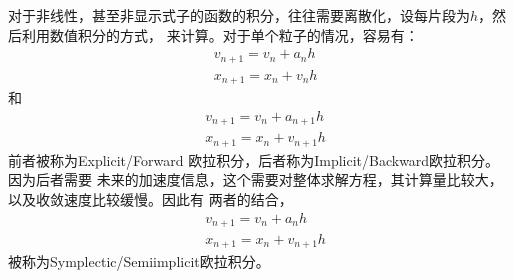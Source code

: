 \documentclass[lang=cn,newtx,10pt,scheme=chinese]{elegantbook}
\begin{document}
对于非线性，甚至非显示式子的函数的积分，往往需要离散化，设每片段为$h$，然后利用数值积分的方式，
来计算。对于单个粒子的情况，容易有：
\begin{equation}
  \begin{aligned}
  & v_{n+1}=v_n+a_n h \\
  & x_{n+1}=x_n+v_n h
  \end{aligned}
\end{equation}
和
\begin{equation}
  \begin{aligned}
  & v_{n+1}=v_n+a_{n+1} h \\
  & x_{n+1}=x_n+v_{n+1} h
  \end{aligned}
\end{equation}
前者被称为Explicit/Forward 欧拉积分，后者称为Implicit/Backward欧拉积分。因为后者需要
未来的加速度信息，这个需要对整体求解方程，其计算量比较大，以及收敛速度比较缓慢。因此有
两者的结合，
\begin{equation}
  \begin{aligned}
  & v_{n+1}=v_n+a_{n} h \\
  & x_{n+1}=x_n+v_{n+1} h
  \end{aligned}
\end{equation}
被称为Symplectic/Semi\-implicit欧拉积分。
\end{document}
